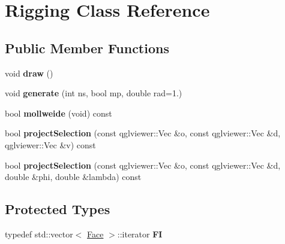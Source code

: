 \hypertarget{classRigging}{
\section{Rigging Class Reference}
\label{classRigging}
}
\subsection*{Public Member Functions}
\begin{DoxyCompactItemize}
\item 
\hypertarget{classRigging_a830185d89f3ef9fad8a79afdf4c11da9}{
void {\bfseries draw} ()}
\label{classRigging_a830185d89f3ef9fad8a79afdf4c11da9}

\item 
\hypertarget{classRigging_acd62a2783380efd3f4c33352894ad9eb}{
void {\bfseries generate} (int ns, bool mp, double rad=1.)}
\label{classRigging_acd62a2783380efd3f4c33352894ad9eb}

\item 
\hypertarget{classRigging_ae8b0193ba8009f7ff6ce9d4bd961fe08}{
bool {\bfseries mollweide} (void) const }
\label{classRigging_ae8b0193ba8009f7ff6ce9d4bd961fe08}

\item 
\hypertarget{classRigging_ade3adf8be73e6ca4f34e2837dc5a8275}{
bool {\bfseries projectSelection} (const qglviewer::Vec \&o, const qglviewer::Vec \&d, qglviewer::Vec \&v) const }
\label{classRigging_ade3adf8be73e6ca4f34e2837dc5a8275}

\item 
\hypertarget{classRigging_a18240637fc01ef8f905675b39854f6b3}{
bool {\bfseries projectSelection} (const qglviewer::Vec \&o, const qglviewer::Vec \&d, double \&phi, double \&lambda) const }
\label{classRigging_a18240637fc01ef8f905675b39854f6b3}

\end{DoxyCompactItemize}
\subsection*{Protected Types}
\begin{DoxyCompactItemize}
\item 
\hypertarget{classRigging_a75cb1aed0e620d3f7dc79eccf0da1861}{
typedef std::vector$<$ \hyperlink{classFace}{Face} $>$::iterator {\bfseries FI}}
\label{classRigging_a75cb1aed0e620d3f7dc79eccf0da1861}

\end{DoxyCompactItemize}
